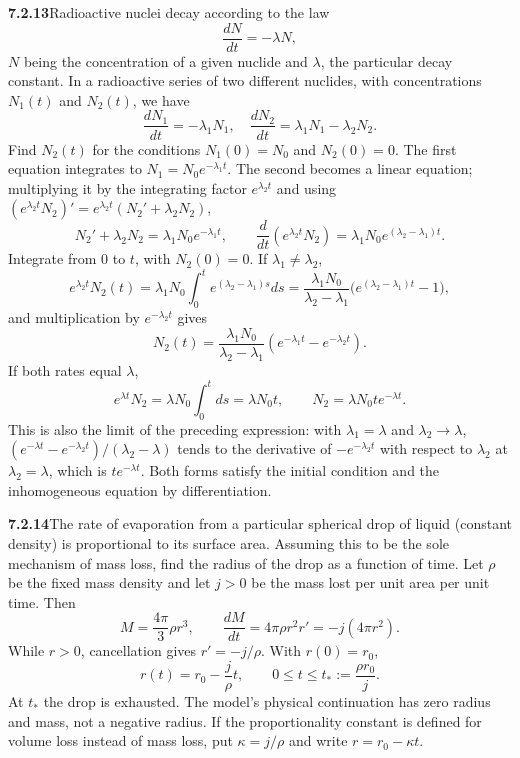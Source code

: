 \par\bigskip
\noindent\textbf{7.2.13}\quad Radioactive nuclei decay according to the law
\[
\frac{dN}{dt}=-\lambda N,
\]
$N$ being the concentration of a given nuclide and $\lambda$, the particular
decay constant. In a radioactive series of two different nuclides, with
concentrations $N_{1}(t)$ and $N_{2}(t)$, we have
\[
\frac{dN_{1}}{dt}=-\lambda_{1}N_{1},\quad
\frac{dN_{2}}{dt}=\lambda_{1}N_{1}-\lambda_{2}N_{2}.
\]
Find $N_{2}(t)$ for the conditions $N_{1}(0)=N_{0}$ and $N_{2}(0)=0$.
\solution
The first equation integrates to $N_1=N_0e^{-\lambda_1t}$. The second
becomes a linear equation; multiplying it by the integrating factor
$e^{\lambda_2t}$ and using
$(e^{\lambda_2t}N_2)'=e^{\lambda_2t}(N_2'+\lambda_2N_2)$,
\[
N_2'+\lambda_2N_2=\lambda_1N_0e^{-\lambda_1t},\qquad
\frac d{dt}(e^{\lambda_2t}N_2)
=\lambda_1N_0e^{(\lambda_2-\lambda_1)t}.
\]
Integrate from $0$ to $t$, with $N_2(0)=0$. If
$\lambda_1\ne\lambda_2$,
\[
e^{\lambda_2t}N_2(t)=\lambda_1N_0\int_0^te^{(\lambda_2-\lambda_1)s}ds
=\frac{\lambda_1N_0}{\lambda_2-\lambda_1}
\bigl(e^{(\lambda_2-\lambda_1)t}-1\bigr),
\]
and multiplication by $e^{-\lambda_2t}$ gives
\[
\boxed{N_2(t)=\frac{\lambda_1N_0}{\lambda_2-\lambda_1}
(e^{-\lambda_1t}-e^{-\lambda_2t})}.
\]
 If both rates equal $\lambda$,
\[
e^{\lambda t}N_2=\lambda N_0\int_0^t ds=\lambda N_0t,
\qquad \boxed{N_2=\lambda N_0t e^{-\lambda t}}.
\]
This is also the limit of the preceding expression: with
$\lambda_1=\lambda$ and $\lambda_2\to\lambda$,
$(e^{-\lambda t}-e^{-\lambda_2t})/(\lambda_2-\lambda)$ tends to the
derivative of $-e^{-\lambda_2t}$ with respect to $\lambda_2$ at
$\lambda_2=\lambda$, which is $te^{-\lambda t}$. Both forms satisfy
the initial condition and the inhomogeneous equation by differentiation.

\par\bigskip
\noindent\textbf{7.2.14}\quad The rate of evaporation from a particular
spherical drop of liquid (constant density) is proportional to its surface
area. Assuming this to be the sole mechanism of mass loss, find the radius of
the drop as a function of time.
\solution
Let $\rho$ be the fixed mass density and let $j>0$ be the mass lost per
unit area per unit time. Then
\[
M=\frac{4\pi}3\rho r^3,\qquad
\frac{dM}{dt}=4\pi\rho r^2r'=-j(4\pi r^2).
\]
While $r>0$, cancellation gives $r'=-j/\rho$. With $r(0)=r_0$,
\[
\boxed{r(t)=r_0-\frac j\rho t,\qquad
0\le t\le t_*:=\frac{\rho r_0}{j}.}
\]
At $t_*$ the drop is exhausted. The model's physical continuation has
zero radius and mass, not a negative radius. If the proportionality
constant is defined for volume loss instead of mass loss, put
$\kappa=j/\rho$ and write $r=r_0-\kappa t$.

